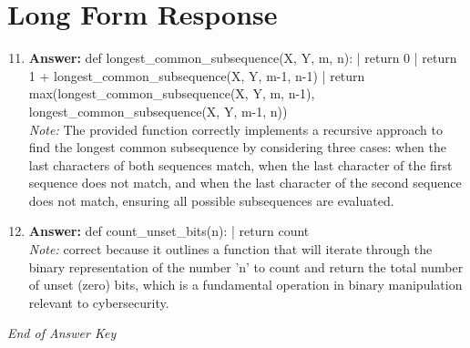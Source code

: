 \documentclass[12pt]{article}
\begin{document}
\section*{Long Form Response}
\begin{enumerate}[label=\arabic*.]
\setcounter{enumi}{10}
\item \textbf{Answer:} def longest\_common\_subsequence(X, Y, m, n): | return 0 | return 1 + longest\_common\_subsequence(X, Y, m-1, n-1) | return max(longest\_common\_subsequence(X, Y, m, n-1), longest\_common\_subsequence(X, Y, m-1, n))
\\ \textit{Note:} The provided function correctly implements a recursive approach to find the longest common subsequence by considering three cases: when the last characters of both sequences match, when the last character of the first sequence does not match, and when the last character of the second sequence does not match, ensuring all possible subsequences are evaluated.
\item \textbf{Answer:} def count\_unset\_bits(n): | return count
\\ \textit{Note:} correct because it outlines a function that will iterate through the binary representation of the number 'n' to count and return the total number of unset (zero) bits, which is a fundamental operation in binary manipulation relevant to cybersecurity.
\end{enumerate}

\vfill
\noindent\textit{End of Answer Key}
\end{document}
